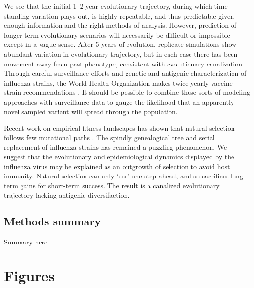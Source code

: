 We see that the initial 1--2 year evolutionary trajectory, during which time standing variation plays out, is highly repeatable, and thus predictable given enough information and the right methods of analysis.  However, prediction of longer-term evolutionary scenarios will necessarily be difficult or impossible except in a vague sense.  After 5 years of evolution, replicate simulations show abundant variation in evolutionary trajectory, but in each case there has been movement away from past phenotype, consistent with evolutionary canalization.  Through careful surveillance efforts and genetic and antigenic characterization of influenza strains, the World Health Organization makes twice-yearly vaccine strain recommendations \cite{Barr10}.  It should be possible to combine these sorts of modeling approaches with surveillance data to gauge the likelihood that an apparently novel sampled variant will spread through the population.

Recent work on empirical fitness landscapes has shown that natural selection follows few mutational paths \cite{Weinreich06}.  The spindly genealogical tree and serial replacement of influenza strains has remained a puzzling phenomenon.  We suggest that the evolutionary and epidemiological dynamics displayed by the influenza virus may be explained as an outgrowth of selection to avoid host immunity.  Natural selection can only `see' one step ahead, and so sacrifices long-term gains for short-term success.  The result is a canalized evolutionary trajectory lacking antigenic diversifaction.

\subsection*{Methods summary}

Summary here.




\pagebreak

\section*{Figures}

